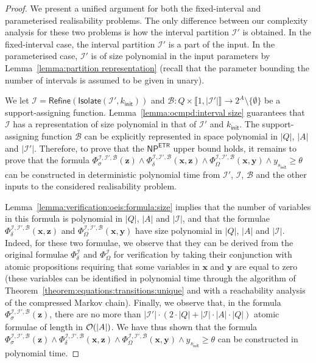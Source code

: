 \documentclass[a4paper,UKenglish,cleveref,autoref,thm-restate,colorlinks]{lipics-v2021}
\newcommand{\init}{\mathsf{init}}
\newcommand{\integerInterval}[1]{\llbracket{}#1\rrbracket{}}
\newcommand{\np}{\textsf{NP}}
\newcommand{\etr}{\textsf{ETR}}
\newcommand{\subsets}[1]{2^{#1}}
\newcommand{\ocStateSpace}{Q}
\newcommand{\ocCount}{k}
\newcommand{\ocConfig}{s}
\newcommand{\ocActionSpace}{A}
\newcommand{\ocTrans}{\delta}
\newcommand{\intPart}{\mathcal{I}}
\newcommand{\varTrans}{x}
\newcommand{\varTransTuple}{\mathbf{\varTrans}}
\newcommand{\varObj}{y}
\newcommand{\varObjTuple}{\mathbf{\varObj}}
\newcommand{\varStrat}{z}
\newcommand{\varStratTuple}{\mathbf{\varStrat}}
\newcommand{\formulaTransBase}{\Phi_{\ocTrans}}
\newcommand{\formulaObjBase}{\Phi_{\objective}}
\newcommand{\formulaStratBase}{\Phi_{\strat}}
\newcommand{\formulaTrans}{\formulaTransBase^\intPart}
\newcommand{\formulaObj}{\formulaObjBase^\intPart}
\newcommand{\suppBounded}{\mathcal{B}}
\newcommand{\formulaStratB}{\formulaStratBase^{\intPart,\intPart',\suppBounded}}
\newcommand{\formulaTransB}{\formulaTransBase^{\intPart,\intPart',\suppBounded}}
\newcommand{\formulaObjB}{\formulaObjBase^{\intPart,\intPart',\suppBounded}}
\newcommand{\objective}{\Omega}
\newcommand{\thresProba}{\theta}
\newcommand{\stratGeneric}[1]{{\sigma_{#1}}}
\newcommand{\strat}{\stratGeneric{}}
\begin{document}
\begin{proof}
  We present a unified argument for both the fixed-interval and parameterised realisability problems.
  The only difference between our complexity analysis for these two problems is how the interval partition $\intPart'$ is obtained.
  In the fixed-interval case, the interval partition $\intPart'$ is a part of the input.
  In the parameterised case, $\intPart'$ is of size polynomial in the input parameters by Lemma~\ref{lemma:partition representation} (recall that the parameter bounding the number of intervals is assumed to be given in unary).
  
  We let $\intPart=\mathsf{Refine}(\mathsf{Isolate}(\intPart', \ocCount_\init))$ and $\suppBounded\colon\ocStateSpace\times\integerInterval{1, |\intPart'|}\to\subsets{\ocActionSpace}\setminus\{\emptyset\}$ be a support-assigning function.
  Lemma~\ref{lemma:ocmpd:interval size} guarantees that $\intPart$ has a representation of size polynomial in that of $\intPart'$ and $\ocCount_\init$.
  The support-assigning function $\suppBounded$ can be explicitly represented in space polynomial in $|\ocStateSpace|$, $|\ocActionSpace|$ and $|\intPart'|$.
  Therefore, to prove that the $\np^\etr$ upper bound holds, it remains to prove that the formula $\formulaStratB(\varStratTuple)\land\formulaTransB(\varTransTuple,\varStratTuple)\land\formulaObjB(\varTransTuple, \varObjTuple)\land \varObj_{\ocConfig_\init}\geq\thresProba$ can be constructed in deterministic polynomial time from $\intPart'$, $\intPart$, $\suppBounded$ and the other inputs to the considered realisability problem.
  
  Lemma~\ref{lemma:verification:oeis:formula:size} implies that the number of variables in this formula is polynomial in $|\ocStateSpace|$, $|\ocActionSpace|$ and $|\intPart|$, and that the formulae $\formulaTransB(\varTransTuple,\varStratTuple)$ and $\formulaObjB(\varTransTuple, \varObjTuple)$ have size polynomial in $|\ocStateSpace|$, $|\ocActionSpace|$ and $|\intPart|$.
  Indeed, for these two formulae, we observe that they can be derived from the original formulae $\formulaTrans$ and $\formulaObj$ for verification by taking their conjunction with atomic propositions requiring that some variables in $\varTransTuple$ and $\varObjTuple$ are equal to zero (these variables can be identified in polynomial time through the algorithm of Theorem~\ref{theorem:equations:transitions:unique} and with a reachability analysis of the compressed Markov chain).
  Finally, we observe that, in the formula $\formulaStratB(\varStratTuple)$, there are no more than $|\intPart'|\cdot (2\cdot|\ocStateSpace| + |\intPart|\cdot|\ocActionSpace|\cdot|\ocStateSpace|)$ atomic formulae of length in $\bigo(|\ocActionSpace|)$.
  We have thus shown that the formula $\formulaStratB(\varStratTuple)\land\formulaTransB(\varTransTuple,\varStratTuple)\land\formulaObjB(\varTransTuple, \varObjTuple)\land \varObj_{\ocConfig_\init}\geq\thresProba$ can be constructed in polynomial time.
\end{proof}
\end{document}
